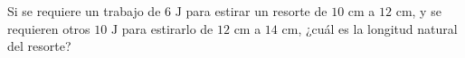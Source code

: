 \item Si se requiere un trabajo de $6 \text{ J}$ para estirar un resorte de $10 \text{ cm}$ a $12 \text{ cm}$, y se requieren otros $10 \text{ J}$ para estirarlo de $12 \text{ cm}$ a $14 \text{ cm}$, ¿cuál es la longitud natural del resorte?
